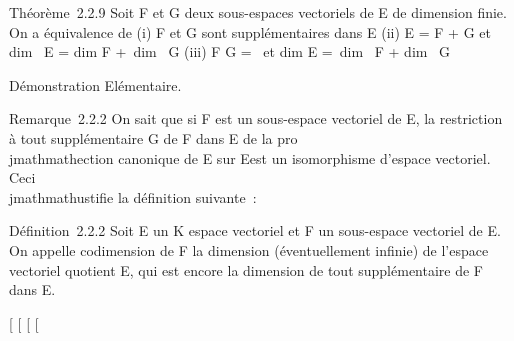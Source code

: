 \documentclass[]{article}
\begin{document}
Théorème~2.2.9 Soit F et G deux sous-espaces vectoriels de E de
dimension finie. On a équivalence de (i) F et G sont supplémentaires
dans E (ii) E = F + G et dim~ E
= dim F +\ dim~ G
(iii) F \bigcap G = \0\ et
dim E =\ dim~ F
+ dim~ G

Démonstration Elémentaire.

Remarque~2.2.2 On sait que si F est un sous-espace vectoriel de E, la
restriction à tout supplémentaire G de F dans E de la pro\\jmathmathection
canonique de E sur E\diagupF est un isomorphisme d'espace vectoriel. Ceci
\\jmathmathustifie la définition suivante~:

Définition~2.2.2 Soit E un K espace vectoriel et F un sous-espace
vectoriel de E. On appelle codimension de F la dimension (éventuellement
infinie) de l'espace vectoriel quotient E\diagupF, qui est encore la dimension
de tout supplémentaire de F dans E.

{[}
{[}
{[}
{[}
\end{document}
